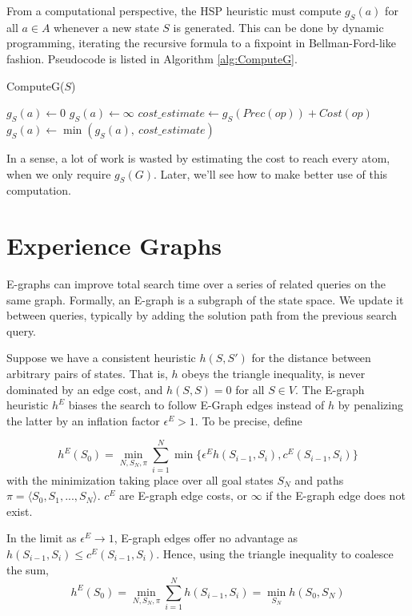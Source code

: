 \documentclass[letterpaper]{article}
\begin{document}
From a computational perspective, the HSP heuristic must compute $g_S(a)$ for all $a\in A$ whenever a new state $S$ is generated.
This can be done by dynamic programming, iterating the recursive formula to a fixpoint in Bellman-Ford-like fashion.
Pseudocode is listed in Algorithm \ref{alg:ComputeG}.

\begin{algorithm}
\caption{ComputeG($S$)}
\label{alg:ComputeG}
\begin{algorithmic}
\STATE $g_S(a) \leftarrow 0$
\ELSE
\STATE $g_S(a) \leftarrow \infty$
\ENDIF
\ENDFOR
\REPEAT
{}
\STATE $cost\_estimate \leftarrow g_S(Prec(op)) + Cost(op)$
\STATE $g_S(a) \leftarrow \min \left(g_S(a),~cost\_estimate\right)$
\ENDFOR
\ENDFOR
{}
\end{algorithmic}
\end{algorithm}

In a sense, a lot of work is wasted by estimating the cost to reach every atom, when we only require $g_S(G)$.
Later, we'll see how to make better use of this computation.

\section{Experience Graphs}

E-graphs can improve total search time over a series of related queries on the same graph.
Formally, an E-graph is a subgraph of the state space.
We update it between queries, typically by adding the solution path from the previous search query.

Suppose we have a consistent heuristic $h(S,S')$ for the distance between arbitrary pairs of states.
That is, $h$ obeys the triangle inequality, is never dominated by an edge cost, and $h(S,S) = 0$ for all $S\in V$.
The E-graph heuristic $h^E$ biases the search to follow E-Graph edges instead of $h$ by penalizing the latter by an inflation factor $\epsilon^E > 1$.
To be precise, define

\[h^E(S_0) = \min_{N,S_N,\pi} \sum_{i=1}^N \min \{\epsilon^E h(S_{i-1},S_i),c^E(S_{i-1},S_i)\}\]
with the minimization taking place over all goal states $S_N$ and paths $\pi = \langle S_0,S_1,...,S_N \rangle$. $c^E$ are E-graph edge costs, or $\infty$ if the E-graph edge does not exist.

In the limit as $\epsilon^E \rightarrow 1$, E-graph edges offer no advantage as $h(S_{i-1},S_i) \le c^E(S_{i-1},S_i)$. Hence, using the triangle inequality to coalesce the sum,
\[h^E(S_0) = \min_{N,S_N,\pi} \sum_{i=1}^N h(S_{i-1},S_i) = \min_{S_N} h(S_0,S_N)\]
\end{document}

